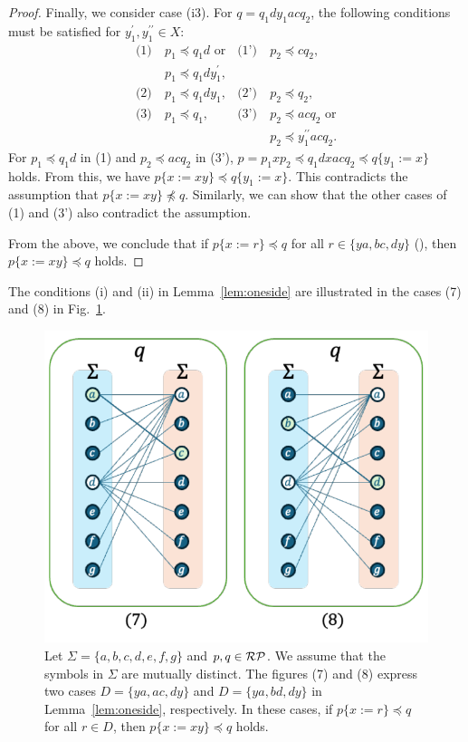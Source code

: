\begin{proof}
Finally, we consider case (i3).
For $q=q_{1}dy_{1}acq_{2}$, the following conditions must be satisfied for $y_{1}^{\prime},y_{1}^{\prime\prime}\in X$:
\begin{align*}
  \textrm{(1)}~& p_{1} \preceq q_{1}d \mbox{~or} & \textrm{(1')}~& p_{2} \preceq cq_{2}, \\
  &  p_{1} \preceq q_{1}dy_{1}^{\prime}, & & \\
  \textrm{(2)}~& p_{1} \preceq q_{1}dy_{1}, & \textrm{(2')}~& p_{2} \preceq q_{2}, \\
  \textrm{(3)}~& p_{1} \preceq q_{1}, & \textrm{(3')}~& p_{2} \preceq acq_{2} \mbox{~or}\\
  & & & p_{2} \preceq y_{1}^{\prime\prime}acq_{2}.
\end{align*}
For $p_{1} \preceq q_{1}d$ in (1) and $p_{2} \preceq acq_{2}$ in (3'), $p = p_{1}xp_{2} \preceq q_{1}dxacq_{2} \preceq q\{y_{1}:=x\}$ holds. From this, we have $p\{x:=xy\} \preceq q\{y_{1}:=x\}$. This contradicts the assumption that $p\{x:=xy\} \not\preceq q$. Similarly, we can show that the other cases of (1) and (3') also contradict the assumption.

From the above, we conclude that if $p \{ x := r \} \preceq q$ for all $r \in \{ ya, bc, dy \}$ (\TheConditionB), then $p \{ x := xy \} \preceq q$ holds.
\end{proof}

The conditions (i) and (ii) in Lemma~\ref{lem:oneside} are illustrated in the cases (7) and (8) in Fig.~\ref{fig:lem6bigraph}.

\begin{figure}[t]
  \begin{center}
    \includegraphics[scale=0.525]{figs/lem6bigraph.pdf}
    \caption{Let $\Sigma=\{a,b,c,d,e,f,g\}$ and $p,q \in \mathcal{RP}$. We assume that the symbols in $\Sigma$ are mutually distinct.
    The figures (7) and (8) express two cases $D = \{ ya, ac, dy \}$ and $D = \{ ya, bd, dy \}$ in Lemma~\ref{lem:oneside}, respectively.
    In these cases, if $p \{ x := r \} \preceq q$ for all $r \in D$, then $p \{ x := xy \} \preceq q$ holds.}\label{fig:lem6bigraph}
  \end{center}
\end{figure}

